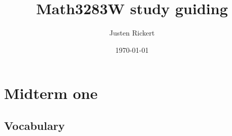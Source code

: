 \documentclass[12pt]{article}
\author{Justen Rickert}
\date{\today}
\title{Math3283W study guiding}
\begin{document}
\maketitle
\tableofcontents

\newcommand\bd[1]{\text{bd }#1}
\newcommand\cl[1]{\text{cl }#1}
\newcommand\interior[1]{\text{int }#1}
\newcommand\lim[1]{\text{lim }#1}
\newcommand\rng[1]{\text{rng }#1}
\newcommand\dom[1]{\text{dom }#1}
\newcommand\min[1]{\text{min }#1}
\newcommand\max[1]{\text{max }#1}

\newcommand{\def}[1]{\textit{\textbf{#1}}}
\newcommand\abs[1]{\left|#1\right|}
\newcommand\deg{\textdegree}
\newcommand\Real{\mathbb{R}}
\newcommand\Natural{\mathbb{N}}
\newcommand\Rational{\mathbb{Q}}
\newcommand\sube{\subseteq}
\newcommand\supe{\supseteq}
\newcommand\setm{\setminus}
\newcommand\pr{\ensuremath{'}}
\newcommand\R{\mathcal{R}}
\newcommand\calR{\mathcal{R}}
\newcommand\calP{\mathcal{P}}
\newcommand\pow{\mathscr{P}}
\newcommand\indX{\mathscr{X}}
\newcommand\F{\mathscr{F}}
\newcommand\G{\mathscr{G}}
\newcommand\nil{\varnothing}

\theoremstyle{definition}
\newtheorem{definition}{Definition}
\newtheorem{theorem}{Theorem}
\newtheorem*{corollary}{Corollary}
\newtheorem*{lemma}{Lemma}
\newtheorem*{remark}{Remark}
\newtheorem*{axiom}{Axiom}
\renewcommand\qedsymbol{$\blacksquare$}

\pagebreak

\section{Midterm one}
\label{sec:org947029f}
\subsection{Vocabulary}
\label{sec:orged738d1}
\end{document}
